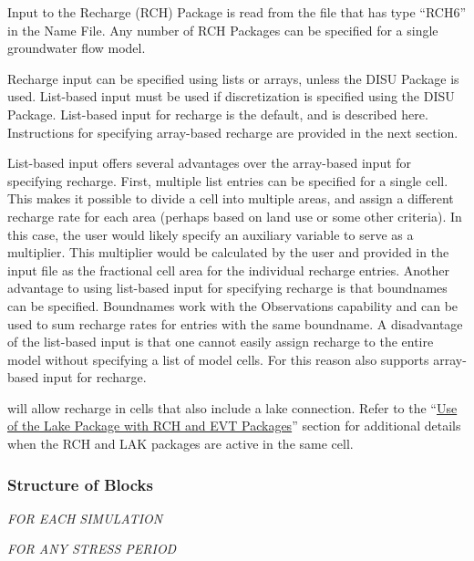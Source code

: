 
Input to the Recharge (RCH) Package is read from the file that has type ``RCH6'' in the Name File.  Any number of RCH Packages can be specified for a single groundwater flow model.

Recharge input can be specified using lists or arrays, unless the DISU Package is used.  List-based input must be used if discretization is specified using the DISU Package.  List-based input for recharge is the default, and is described here.  Instructions for specifying array-based recharge are provided in the next section. 

List-based input offers several advantages over the array-based input for specifying recharge.  First, multiple list entries can be specified for a single cell.  This makes it possible to divide a cell into multiple areas, and assign a different recharge rate for each area (perhaps based on land use or some other criteria).  In this case, the user would likely specify an auxiliary variable to serve as a multiplier.  This multiplier would be calculated by the user and provided in the input file as the fractional cell area for the individual recharge entries.  Another advantage to using list-based input for specifying recharge is that boundnames can be specified.  Boundnames work with the Observations capability and can be used to sum recharge rates for entries with the same boundname.  A disadvantage of the list-based input is that one cannot easily assign recharge to the entire model without specifying a list of model cells.  For this reason \mf also supports array-based input for recharge.

\mf will allow recharge in cells that also include a lake connection.  Refer to the ``\hyperref[sec:lakrchet]{Use of the Lake Package with RCH and EVT Packages}'' section for additional details when the RCH and LAK packages are active in the same cell.  

\vspace{5mm}
\subsubsection{Structure of Blocks}
\vspace{5mm}

\noindent \textit{FOR EACH SIMULATION}


\vspace{5mm}
\noindent \textit{FOR ANY STRESS PERIOD}

\packageperioddescription

